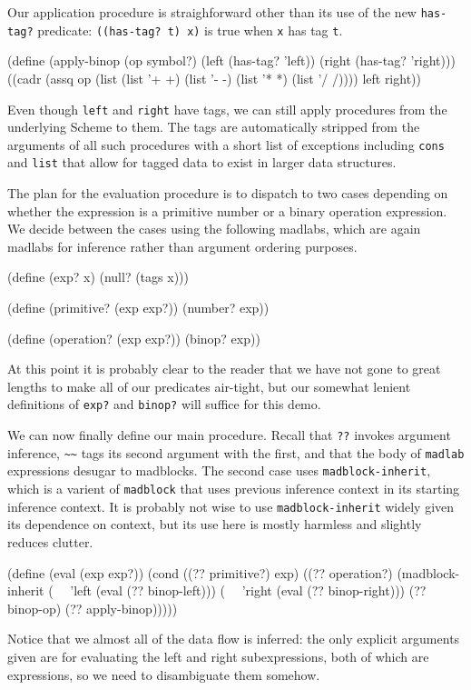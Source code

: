 \documentclass[11pt]{article}
\begin{document}
Our application procedure is straighforward
other than its use of the new \texttt{has-tag?} predicate:
\texttt{((has-tag? t) x)} is true when \texttt{x} has tag \texttt{t}.
\begin{verbbox}
(define (apply-binop (op symbol?)
                     (left (has-tag? 'left))
                     (right (has-tag? 'right)))
  ((cadr (assq op
               (list (list '+ +)
                     (list '- -)
                     (list '* *)
                     (list '/ /))))
   left
   right))
\end{verbbox}
\begin{center}\theverbbox\end{center}
Even though \texttt{left} and \texttt{right} have tags,
we can still apply procedures from the underlying Scheme to them.
The tags are automatically stripped from the arguments of all such procedures
with a short list of exceptions including \texttt{cons} and \texttt{list}
that allow for tagged data to exist in larger data structures.

The plan for the evaluation procedure is to dispatch to two cases
depending on whether the expression is a primitive number
or a binary operation expression.
We decide between the cases using the following madlabs,
which are again madlabs for inference rather than argument ordering purposes.
\begin{verbbox}
(define (exp? x)
  (null? (tags x)))

(define (primitive? (exp exp?))
  (number? exp))

(define (operation? (exp exp?))
  (binop? exp))
\end{verbbox}
\begin{center}\theverbbox\end{center}
At this point it is probably clear to the reader that
we have not gone to great lengths to make all of our predicates air-tight,
but our somewhat lenient definitions of \texttt{exp?} and \texttt{binop?}
will suffice for this demo.

We can now finally define our main procedure.
Recall that \texttt{??} invokes argument inference,
\verb|~~| tags its second argument with the first,
and that the body of \texttt{madlab} expressions
desugar to madblocks.
The second case uses \texttt{madblock-inherit},
which is a varient of \texttt{madblock} that
uses previous inference context
in its starting inference context.
It is probably not wise to use \texttt{madblock-inherit} widely
given its dependence on context,
but its use here is mostly harmless and slightly reduces clutter.
\begin{verbbox}
(define (eval (exp exp?))
  (cond
   ((?? primitive?)
    exp)
   ((?? operation?)
    (madblock-inherit
     (~~ 'left (eval (?? binop-left)))
     (~~ 'right (eval (?? binop-right)))
     (?? binop-op)
     (?? apply-binop)))))
\end{verbbox}
\begin{center}\theverbbox\end{center}
Notice that we almost all of the data flow is inferred:
the only explicit arguments given are for evaluating
the left and right subexpressions,
both of which are expressions, so we need to disambiguate them somehow.
\end{document}

